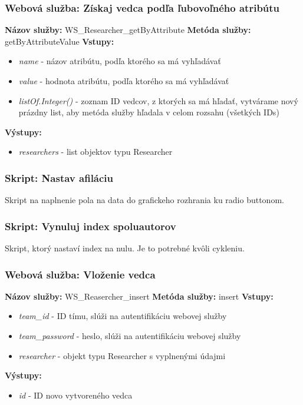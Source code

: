 \documentclass[10pt,oneside,slovak,a4paper]{article}
\begin{document}
\subsubsection{Webová služba: Získaj vedca podľa ľubovoľného atribútu}
\textbf{Názov služby:} WS\_Researcher\_getByAttribute
\textbf{Metóda služby:} getByAttributeValue
\textbf{Vstupy:}
	\begin{itemize}
		\item \textit{name} - názov atribútu, podľa ktorého sa má vyhľadávať
		\item \textit{value} - hodnota atribútu, podľa ktorého sa má vyhľadávať
		\item \textit{listOf.Integer()} - zoznam ID vedcov, z ktorých sa má hľadať, vytvárame nový prázdny list, aby metóda služby hľadala v celom rozsahu (všetkých IDs)
	\end{itemize}
\textbf{Výstupy:}
	\begin{itemize}
		\item \textit{researchers} - list objektov typu Researcher 
	\end{itemize}
	
\subsubsection{Skript: Nastav afiláciu}
Skript na naplnenie pola na data do grafickeho rozhrania ku radio buttonom.

\subsubsection{Skript: Vynuluj index spoluautorov}
Skript, ktorý nastaví index na nulu. Je to potrebné kvôli cykleniu.

\subsubsection{Webová služba: Vloženie vedca}
\textbf{Názov služby:} WS\_Reasercher\_insert
\textbf{Metóda služby:} insert
\textbf{Vstupy:}
	\begin{itemize}
		\item \textit{team\_id} - ID tímu, slúži na autentifikáciu webovej služby
		\item \textit{team\_password} - heslo, slúži na autentifikáciu webovej služby
		\item \textit{researcher} - objekt typu Researcher s vyplnenými údajmi
	\end{itemize}
\textbf{Výstupy:}
	\begin{itemize}
		\item \textit{id} - ID novo vytvoreného vedca
	\end{itemize}
\end{document}
